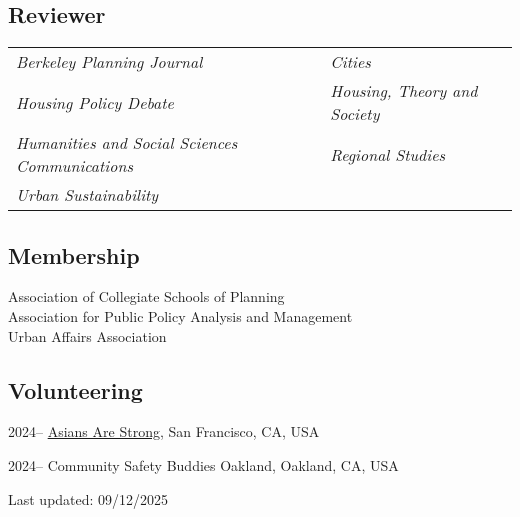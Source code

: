 \documentclass[11pt,letterpaper]{article}
\begin{document}
\subsection{Reviewer}
\begin{tabular}{@{}p{} p{}@{}}
\emph{Berkeley Planning Journal} & \emph{Cities}\\
\emph{Housing Policy Debate} & \emph{Housing, Theory and Society}\\
\emph{Humanities and Social Sciences Communications} & \emph{Regional Studies}\\
\emph{Urban Sustainability} &
\end{tabular}

\subsection{Membership}
Association of Collegiate Schools of Planning\\
Association for Public Policy Analysis and Management\\
Urban Affairs Association

\subsection{Volunteering}
\begin{tablist}
  \item[2024– ] \tab{}\href{https://asiansarestrong.org/}{Asians Are Strong}, San Francisco, CA, USA
  \item[2024– ] \tab{}Community Safety Buddies Oakland, Oakland, CA, USA
\end{tablist}

\vspace{1.0\baselineskip}
{\footnotesize Last updated: 09/12/2025}
\end{document}
